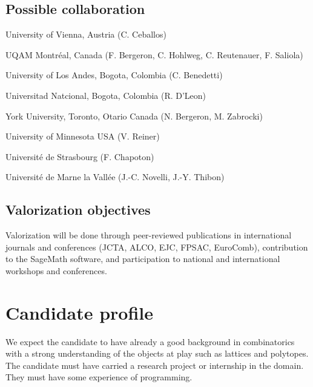 \documentclass[a4paper,12pt]{article}
\begin{document}
\subsection{Possible collaboration}

\begin{compactitem}
\item University of Vienna, Austria (C. Ceballos)
\item UQAM Montréal, Canada (F. Bergeron, C. Hohlweg, C. Reutenauer, F. Saliola)
\item University of Los Andes, Bogota, Colombia (C. Benedetti)
\item Universitad Natcional, Bogota, Colombia (R. D'Leon)
\item York University, Toronto, Otario Canada (N. Bergeron, M. Zabrocki)
\item University of Minnesota USA (V. Reiner)
\item Université de Strasbourg (F. Chapoton)
\item Université de Marne la Vallée (J.-C. Novelli, J.-Y. Thibon)
\end{compactitem}

\subsection{Valorization objectives}

Valorization will be done through peer-reviewed publications in international journals and conferences (JCTA, ALCO, EJC, FPSAC, EuroComb), contribution to the SageMath software, and participation to national and international workshops and conferences.

\section{Candidate profile}

We expect the candidate to have already a good background in combinatorics with a strong understanding of the objects at play such as lattices and polytopes. The candidate must have carried a research project or internship in the domain. They must have some experience of programming.


\small
\renewcommand{\refname}{\normalsize Bibliography}

\normalsize
\end{document}

